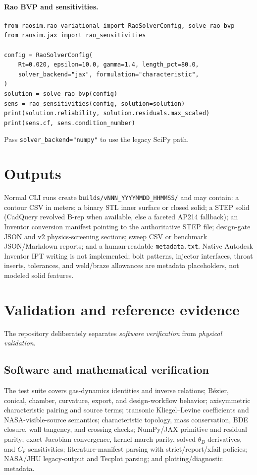 \documentclass[11pt]{article}
\newcommand{\code}[1]{\texttt{#1}}
\begin{document}
\paragraph{Rao BVP and sensitivities.}
\begin{lstlisting}[style=py]
from raosim.rao_variational import RaoSolverConfig, solve_rao_bvp
from raosim.jax import rao_sensitivities

config = RaoSolverConfig(
    Rt=0.020, epsilon=10.0, gamma=1.4, length_pct=80.0,
    solver_backend="jax", formulation="characteristic",
)
solution = solve_rao_bvp(config)
sens = rao_sensitivities(config, solution=solution)
print(solution.reliability, solution.residuals.max_scaled)
print(sens.cf, sens.condition_number)
\end{lstlisting}
Pass \code{solver\_backend="numpy"} to use the legacy SciPy path.

\section{Outputs}

Normal CLI runs create \code{builds/vNNN\_YYYYMMDD\_HHMMSS/} and may contain:
a contour CSV in meters; a binary STL inner surface or closed solid; a STEP
solid (CadQuery revolved B-rep when available, else a faceted AP214 fallback);
an Inventor conversion manifest pointing to the authoritative STEP file;
design-gate JSON and v2 physics-screening sections; sweep CSV or benchmark
JSON/Markdown reports; and a human-readable \code{metadata.txt}. Native
Autodesk Inventor IPT writing is not implemented; bolt patterns, injector
interfaces, throat inserts, tolerances, and weld/braze allowances are
metadata placeholders, not modeled solid features.

\section{Validation and reference evidence}

The repository deliberately separates \emph{software verification} from
\emph{physical validation}.

\subsection{Software and mathematical verification}
The test suite covers gas-dynamics identities and inverse relations; B\'ezier,
conical, chamber, curvature, export, and design-workflow behavior;
axisymmetric characteristic pairing and source terms; transonic
Kliegel--Levine coefficients and NASA-visible-source semantics; characteristic
topology, mass conservation, BDE closure, wall tangency, and crossing checks;
NumPy/JAX primitive and residual parity; exact-Jacobian convergence,
kernel-march parity, solved-$\theta_B$ derivatives, and $C_F$ sensitivities;
literature-manifest parsing with strict/report/xfail policies; NASA/JHU
legacy-output and Tecplot parsing; and plotting/diagnostic metadata.
\end{document}

